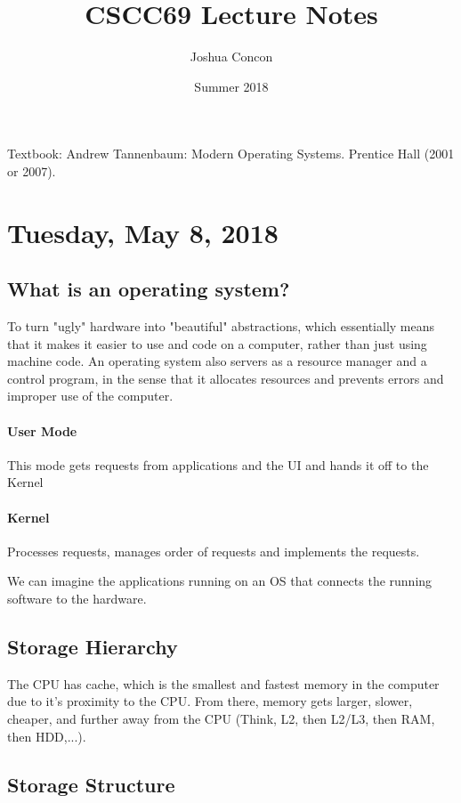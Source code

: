 \documentclass{article}
\title{CSCC69 Lecture Notes}
\author{Joshua Concon}
\date{Summer 2018}
\begin{document}
\maketitle

Textbook: Andrew Tannenbaum: Modern Operating Systems. Prentice Hall (2001 or 2007).

\tableofcontents

\pagebreak

\section{Tuesday, May 8, 2018}

\subsection{What is an operating system?}

To turn "ugly" hardware into "beautiful" abstractions, which essentially means that it makes it easier to use and code on a computer, rather than just using machine code. An operating system also servers as a resource manager and a control program, in the sense that it allocates resources and prevents errors and improper use of the computer.

\paragraph{User Mode} This mode gets requests from applications and the UI and hands it off to the Kernel

\paragraph{Kernel} Processes requests, manages order of requests and implements the requests.

We can imagine the applications running on an OS that connects the running software to the hardware.

\subsection{Storage Hierarchy}

The CPU has cache, which is the smallest and fastest memory in the computer due to it's proximity to the CPU. From there, memory gets larger, slower, cheaper, and further away from the CPU (Think, L2, then L2/L3, then RAM, then HDD,...).

\subsection{Storage Structure}
\end{document}
